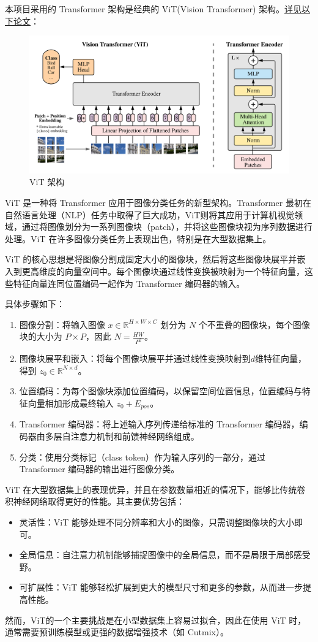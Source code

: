 \documentclass[notitlepage,cs4size,punct,oneside]{ctexrep}
\numberwithin{equation}{chapter}
\theoremstyle{mystyle}
\begin{document}
本项目采用的 Transformer 架构是经典的 ViT(Vision Transformer) 架构。\href{https://arxiv.org/pdf/2010.11929.pdf?fbclid=IwAR1NafJDhZjkARvCswpV6kS9_hMa0ycvzwhlCb7cqAGwgzComFXcScxgA8o}{详见以下论文}：
\begin{figure}[H]
    \centering
    \includegraphics[scale=0.55]{ViT.png}
    \caption{ViT 架构}
\end{figure}
ViT 是一种将 Transformer 应用于图像分类任务的新型架构。Transformer 最初在自然语言处理（NLP）任务中取得了巨大成功，ViT则将其应用于计算机视觉领域，通过将图像划分为一系列图像块（patch），并将这些图像块视为序列数据进行处理。ViT 在许多图像分类任务上表现出色，特别是在大型数据集上。

ViT 的核心思想是将图像分割成固定大小的图像块，然后将这些图像块展平并嵌入到更高维度的向量空间中。每个图像块通过线性变换被映射为一个特征向量，这些特征向量连同位置编码一起作为 Transformer 编码器的输入。

具体步骤如下：
\begin{enumerate}
    \item 图像分割：将输入图像 $x \in \mathbb{R}^{H \times W \times C}$ 划分为 $N$ 个不重叠的图像块，每个图像块的大小为 $P \times P$，因此 $N = \frac{HW}{P^2}$。
    \item 图像块展平和嵌入：将每个图像块展平并通过线性变换映射到$d$维特征向量，得到 $z_0 \in \mathbb{R}^{N \times d}$。
    \item 位置编码：为每个图像块添加位置编码，以保留空间位置信息，位置编码与特征向量相加形成最终输入 $z_0 + E_{pos}$。
    \item Transformer 编码器：将上述输入序列传递给标准的 Transformer 编码器，编码器由多层自注意力机制和前馈神经网络组成。
    \item 分类：使用分类标记（class token）作为输入序列的一部分，通过 Transformer 编码器的输出进行图像分类。
\end{enumerate}
ViT 在大型数据集上的表现优异，并且在参数数量相近的情况下，能够比传统卷积神经网络取得更好的性能。其主要优势包括：
\begin{itemize}
    \item 灵活性：ViT 能够处理不同分辨率和大小的图像，只需调整图像块的大小即可。
    \item 全局信息：自注意力机制能够捕捉图像中的全局信息，而不是局限于局部感受野。
    \item 可扩展性：ViT 能够轻松扩展到更大的模型尺寸和更多的参数，从而进一步提高性能。
\end{itemize}
然而，ViT的一个主要挑战是在小型数据集上容易过拟合，因此在使用 ViT 时，通常需要预训练模型或更强的数据增强技术（如 Cutmix）。
\end{document}
